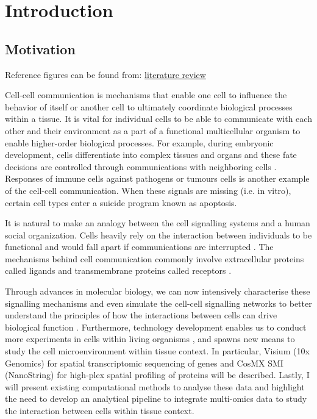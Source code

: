 \chapter[Introduction]{Introduction}
\label{Chap:Intro}


\section{Motivation}
Reference figures can be found from: \href{https://docs.google.com/presentation/d/e/2PACX-1vStLQUYLX4Hgc6rpiWYoEg28kEBAMC_q9z7_FTtKtSesD8EMjVkaI1QWdHsZ-dIjX2FTbQPnbvg2Izx/pub?start=false&loop=false&delayms=3000&slide=id.g13646a8cd1b_0_351}{literature review}

Cell-cell communication is mechanisms that enable one cell to influence the behavior of itself or another cell to ultimately coordinate biological processes within a tissue. It is vital for individual cells to be able to communicate with each other and their environment as a part of a functional multicellular organism to enable higher-order biological processes. For example, during embryonic development, cells differentiate into complex tissues and organs and these fate decisions are controlled through communications with neighboring cells \cite{gale1996eph, eichmann1997ligand}. Responses of immune cells against pathogens or tumours cells is another example of the cell-cell communication. When these signals are missing (i.e. in vitro), certain cell types enter a suicide program known as apoptosis. 

It is natural to make an analogy between the cell signalling systems and a human social organization. Cells heavily rely on the interaction between individuals to be functional and would fall apart if communications are interrupted \cite{bartee2018principles}. The mechanisms behind cell communication commonly involve extracellular proteins called ligands and transmembrane proteins called receptors \cite{alberts2018molecular}. 

Through advances in molecular biology, we can now intensively characterise these signalling mechanisms and even simulate the cell-cell signalling networks to better understand the principles of how the interactions between cells can drive biological function \cite{sprinzak2010cis, teague2016synthetic, toda2019engineering}. Furthermore, technology development enables us to conduct more experiments in cells within living organisms \cite{helmchen2005deep, periasamy2013methods}, and spawns new means to study the cell microenvironment within tissue context. In particular, Visium (10x Genomics) for spatial transcriptomic sequencing of genes and CosMX SMI (NanoString) for high-plex spatial profiling of proteins will be described. Lastly, I will present existing computational methods to analyse these data and highlight the need to develop an analytical pipeline to integrate multi-omics data to study the interaction between cells within tissue context.      

